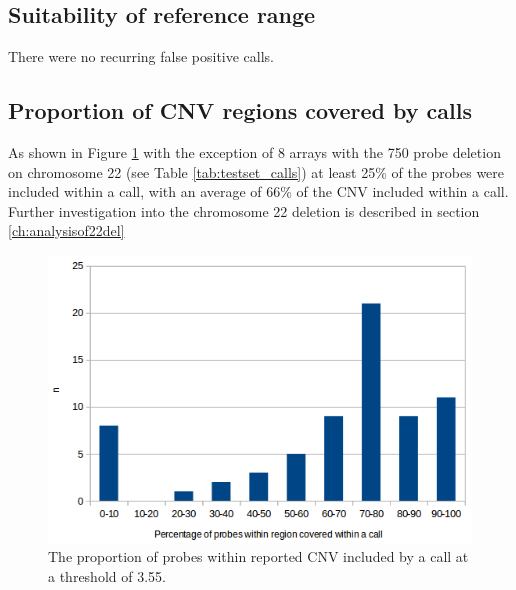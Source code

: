 \subsection{Suitability of reference range}
There were no recurring false positive calls.

\subsection{Proportion of CNV regions covered by calls}
As shown in Figure \ref{fig:testcasestrueposcoverage} with the exception of 8 arrays with the 750 probe deletion on chromosome 22 (see Table \ref{tab:testset_calls}) at least 25\% of the probes were included within a call, with an average of 66\% of the CNV included within a call. Further investigation into the chromosome 22 deletion is described in section \ref{ch:analysisof22del}


\begin{figure}[h]
\centering
\includegraphics[width=1\linewidth]{./Figures/testcasestrueposcoverage}
\caption[Test cases: the proportion of probes within reported CNV included by a call at a threshold of 3.55]{The proportion of probes within reported CNV included by a call at a threshold of 3.55.}
\label{fig:testcasestrueposcoverage}
\end{figure}
